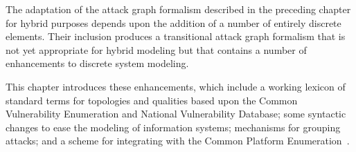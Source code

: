 The adaptation of the attack graph formalism described in
the preceding chapter for hybrid purposes depends upon the addition of a number
of entirely discrete elements. Their inclusion produces a transitional
attack graph formalism that is not yet appropriate for hybrid modeling but that
contains a number of enhancements to discrete system modeling.

This chapter introduces these enhancements, which include a working lexicon of
standard terms for topologies and qualities based upon the Common Vulnerability
Enumeration and National Vulnerability Database; some syntactic
changes to ease the modeling of information systems;
mechanisms for grouping attacks; and a scheme for integrating with
the Common Platform Enumeration~\cite{buttner2009common}.

